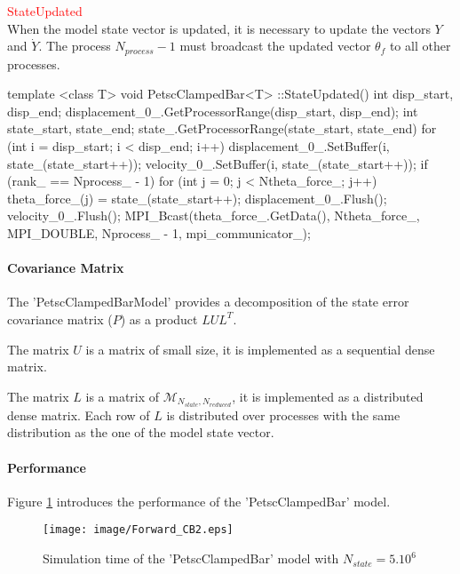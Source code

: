 \documentclass{tufte-book}
\begin{document}
\par \textcolor{red}{StateUpdated}\\


When the model state vector is updated, it is necessary to update the vectors $Y$ and $\dot Y$. The process $N_{process} - 1$ must broadcast the updated vector $\theta_f$ to all other processes.

\begin{frame_cpp}
template <class T>
void PetscClampedBar<T>
::StateUpdated()
{
    int disp_start, disp_end;
    displacement_0_.GetProcessorRange(disp_start, disp_end);
    int state_start, state_end;
    state_.GetProcessorRange(state_start, state_end)
    for (int i = disp_start; i < disp_end; i++)
    {
        displacement_0_.SetBuffer(i, state_(state_start++));
        velocity_0_.SetBuffer(i, state_(state_start++));
    }
    if (rank_ == Nprocess_ - 1)
        for (int j = 0; j < Ntheta_force_; j++)
            theta_force_(j) = state_(state_start++);
    displacement_0_.Flush();
    velocity_0_.Flush();
    MPI_Bcast(theta_force_.GetData(), Ntheta_force_, MPI_DOUBLE, Nprocess_ - 1, mpi_communicator_);
}
\end{frame_cpp}



\hypertarget{seq-par-dm-cm}{}\paragraph{Covariance Matrix}\label{seq-par-dm-cm}

The 'PetscClampedBarModel' provides a decomposition of the state error covariance matrix ($P$) as a product $LUL^T$.

The matrix $U$ is a matrix of small size, it is implemented as a sequential dense matrix.

The matrix $L$ is a matrix of $\mathcal{M}_{N_{state}, N_{reduced}}$, it is implemented as a distributed dense matrix. Each row of $L$ is distributed over processes with the same distribution as the one of the model state vector.

\hypertarget{seq-par-dm-p}{}\paragraph{Performance}\label{seq-par-dm-p}


Figure  \ref{fig:forward_time} introduces the performance of the 'PetscClampedBar' model.


\begin{figure}
  \caption{Simulation time of the 'PetscClampedBar' model with $N_{state} = 5.10^6$ }
  \label{fig:forward_time}

\texttt{[image: image/Forward\_CB2.eps]}
\end{figure}
\end{document}
